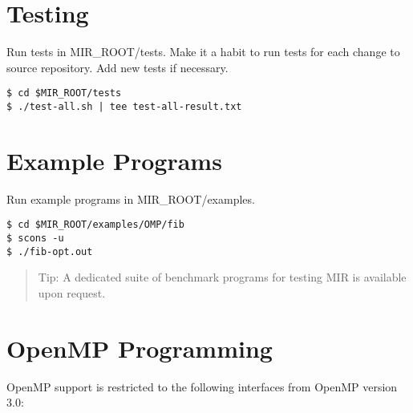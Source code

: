 \documentclass[11pt,a4paper]{article}
\begin{document}
\section{Testing}\label{sec:testing}

Run tests in \textsf{MIR\_ROOT/tests}. Make it a habit to run tests for each change to source repository. Add new tests if necessary.

\begin{lstlisting}[style=MyInputStyle]
$ cd $MIR_ROOT/tests
$ ./test-all.sh | tee test-all-result.txt
\end{lstlisting}

\section{Example Programs}\label{sec:examples}

Run example programs in \textsf{MIR\_ROOT/examples}.

\begin{lstlisting}[style=MyInputStyle]
$ cd $MIR_ROOT/examples/OMP/fib
$ scons -u
$ ./fib-opt.out
\end{lstlisting}

\begin{framed}
\begin{quote}
Tip: A dedicated suite of benchmark programs for testing MIR is available upon request.
\end{quote}
\end{framed}

\section{OpenMP Programming}\label{sec:openmp-programming}

OpenMP support is restricted to the following interfaces from OpenMP version 3.0:
\end{document}
